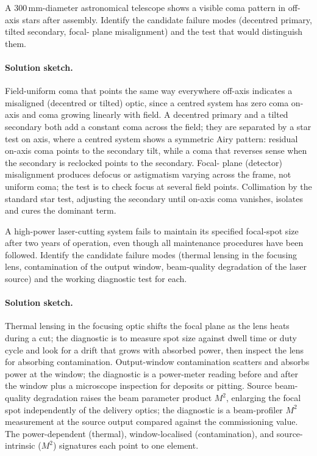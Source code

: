 \begin{exercise}
A $300\,\si{\milli\meter}$-diameter astronomical telescope shows a
visible coma pattern in off-axis stars after assembly. Identify the
candidate failure modes (decentred primary, tilted secondary, focal-
plane misalignment) and the test that would distinguish them.
\paragraph{Solution sketch.} Field-uniform coma that points the same way
everywhere off-axis indicates a misaligned (decentred or tilted) optic,
since a centred system has zero coma on-axis and coma growing linearly
with field. A decentred primary and a tilted secondary both add a
constant coma across the field; they are separated by a star test on
axis, where a centred system shows a symmetric Airy pattern: residual
on-axis coma points to the secondary tilt, while a coma that reverses
sense when the secondary is reclocked points to the secondary. Focal-
plane (detector) misalignment produces defocus or astigmatism varying
across the frame, not uniform coma; the test is to check focus at
several field points. Collimation by the standard star test, adjusting
the secondary until on-axis coma vanishes, isolates and cures the
dominant term.
\end{exercise}

\begin{exercise}
A high-power laser-cutting system fails to maintain its specified
focal-spot size after two years of operation, even though all
maintenance procedures have been followed. Identify the candidate
failure modes (thermal lensing in the focusing lens, contamination
of the output window, beam-quality degradation of the laser source)
and the working diagnostic test for each.
\paragraph{Solution sketch.} Thermal lensing in the focusing optic
shifts the focal plane as the lens heats during a cut; the diagnostic is
to measure spot size against dwell time or duty cycle and look for a
drift that grows with absorbed power, then inspect the lens for
absorbing contamination. Output-window contamination scatters and
absorbs power at the window; the diagnostic is a power-meter reading
before and after the window plus a microscope inspection for deposits or
pitting. Source beam-quality degradation raises the beam parameter
product $M^{2}$, enlarging the focal spot independently of the delivery
optics; the diagnostic is a beam-profiler $M^{2}$ measurement at the
source output compared against the commissioning value. The
power-dependent (thermal), window-localised (contamination), and
source-intrinsic ($M^{2}$) signatures each point to one element.
\end{exercise}

